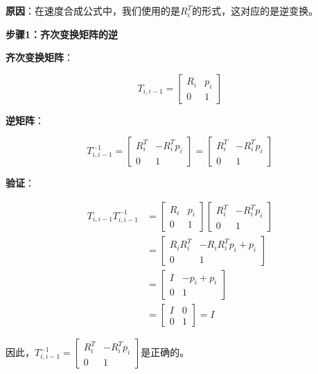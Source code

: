 \documentclass[12pt,a4paper]{article}
\begin{document}
\textbf{原因}：在速度合成公式中，我们使用的是$R_i^T$的形式，这对应的是逆变换。

\textbf{步骤1：齐次变换矩阵的逆}

\textbf{齐次变换矩阵}：

\begin{equation}
T_{i,i-1} = \begin{bmatrix} R_i & p_i \\ 0 & 1 \end{bmatrix}
\end{equation}

\textbf{逆矩阵}：

\begin{equation}
T_{i,i-1}^{-1} = \begin{bmatrix} R_i^T & -R_i^T p_i \\ 0 & 1 \end{bmatrix} = \begin{bmatrix} R_i^T & -R_i^T p_i \\ 0 & 1 \end{bmatrix}
\end{equation}

\textbf{验证}：

\begin{align}
T_{i,i-1} T_{i,i-1}^{-1} &= \begin{bmatrix} R_i & p_i \\ 0 & 1 \end{bmatrix} \begin{bmatrix} R_i^T & -R_i^T p_i \\ 0 & 1 \end{bmatrix} \\
&= \begin{bmatrix} R_i R_i^T & -R_i R_i^T p_i + p_i \\ 0 & 1 \end{bmatrix} \\
&= \begin{bmatrix} I & -p_i + p_i \\ 0 & 1 \end{bmatrix} \\
&= \begin{bmatrix} I & 0 \\ 0 & 1 \end{bmatrix} = I
\end{align}

因此，$T_{i,i-1}^{-1} = \begin{bmatrix} R_i^T & -R_i^T p_i \\ 0 & 1 \end{bmatrix}$是正确的。
\end{document}
